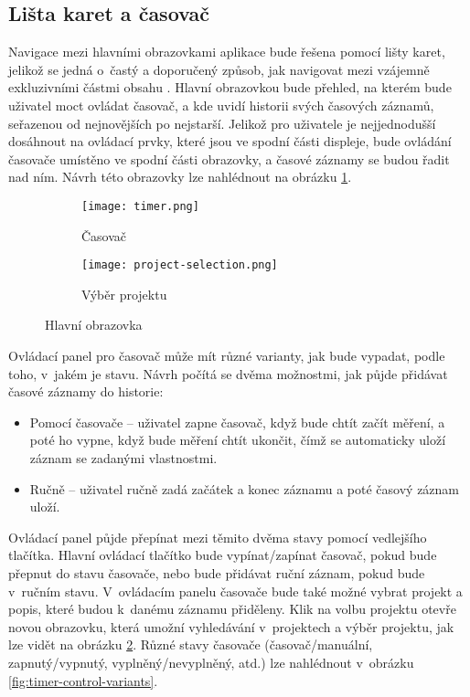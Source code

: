 \subsection{Lišta karet a časovač}\label{feature-timer}

Navigace mezi hlavními obrazovkami aplikace bude řešena pomocí lišty karet, jelikož se jedná o~častý a doporučený způsob, jak navigovat mezi vzájemně exkluzivními částmi obsahu \cite{apple-guidelines-tabbars}. Hlavní obrazovkou bude přehled, na kterém bude uživatel moct ovládat časovač, a kde uvidí historii svých časových záznamů, seřazenou od nejnovějších po nejstarší. Jelikož pro uživatele je nejjednodušší dosáhnout na ovládací prvky, které jsou ve spodní části displeje, bude ovládání časovače umístěno ve spodní části obrazovky, a časové záznamy se budou řadit nad ním. Návrh této obrazovky lze nahlédnout na obrázku \ref{fig:timer}.

\begin{figure}[h]
    \centering
    \begin{subfigure}[b]{0.4\textwidth}
		\centering
		\texttt{[image: timer.png]}
		\caption{Časovač}
		\label{fig:timer}
	\end{subfigure}
	\hspace{2cm}
	\begin{subfigure}[b]{0.4\textwidth}
		\centering
		\texttt{[image: project-selection.png]}
		\caption{Výběr projektu}
		\label{fig:project-selection}
	\end{subfigure}
	\caption{Hlavní obrazovka}
	\label{fig:timer-and-project-selection}
\end{figure}

Ovládací panel pro časovač může mít různé varianty, jak bude vypadat, podle toho, v~jakém je stavu. Návrh počítá se dvěma možnostmi, jak půjde přidávat časové záznamy do historie:
\begin{itemize}
\item Pomocí časovače – uživatel zapne časovač, když bude chtít začít měření, a poté ho vypne, když bude měření chtít ukončit, čímž se automaticky uloží záznam se zadanými vlastnostmi.
\item Ručně – uživatel ručně zadá začátek a konec záznamu a poté časový záznam uloží.
\end{itemize}
Ovládací panel půjde přepínat mezi těmito dvěma stavy pomocí vedlejšího tlačítka. Hlavní ovládací tlačítko bude vypínat/zapínat časovač, pokud bude přepnut do stavu časovače, nebo bude přidávat ruční záznam, pokud bude v~ručním stavu. V~ovládacím panelu časovače bude také možné vybrat projekt a popis, které budou k~danému záznamu přiděleny. Klik na volbu projektu otevře novou obrazovku, která umožní vyhledávání v~projektech a výběr projektu, jak lze vidět na obrázku \ref{fig:project-selection}. Různé stavy časovače (časovač/manuální, zapnutý/vypnutý, vyplněný/nevyplněný, atd.) lze nahlédnout v~obrázku \ref{fig:timer-control-variants}.

